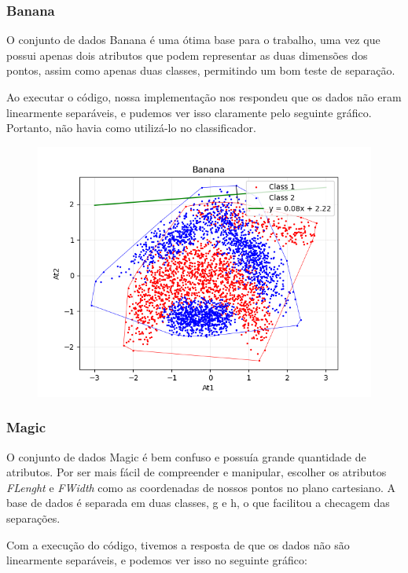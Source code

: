 \documentclass{article}
\begin{document}
\subsubsection{Banana}

O conjunto de dados Banana é uma ótima base para o trabalho, uma vez que possui apenas dois atributos que podem representar as duas dimensões dos pontos, assim como apenas duas classes, permitindo um bom teste de separação.

Ao executar o código, nossa implementação nos respondeu que os dados não eram linearmente separáveis, e pudemos ver isso claramente pelo seguinte gráfico. Portanto, não havia como utilizá-lo no classificador.

\begin{figure} [H]
	\includegraphics[width=12cm]{banana.png}
	\centering
\end{figure}

\subsubsection{Magic}

O conjunto de dados Magic é bem confuso e possuía grande quantidade de atributos. Por ser mais fácil de compreender e manipular, escolher os atributos \textit{FLenght} e \textit{FWidth} como as coordenadas de nossos pontos no plano cartesiano. A base de dados é separada em duas classes, g e h, o que facilitou a checagem das separações.

Com a execução do código, tivemos a resposta de que os dados não são linearmente separáveis, e podemos ver isso no seguinte gráfico:
\end{document}

